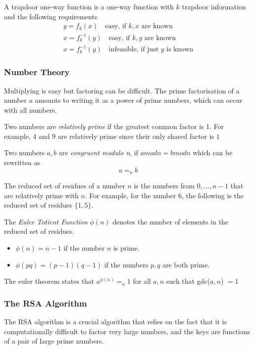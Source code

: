 \documentclass[11pt]{article}
\begin{document}
A trapdoor one-way function is a one-way function with $k$ trapdoor information and the following requirements
\begin{gather}
    y = f_k(x) \quad \text{easy, if $k,x$ are known} \\
    x = f_k^{-1}(y) \quad \text{easy, if $k,y$ are known} \\
    x = f_k^{-1}(y) \quad \text{infeasible, if just $y$ is known}
\end{gather}

\subsubsection{Number Theory}
Multiplying is easy but factoring can be difficult.
The prime factorisation of a number $a$ amounts to writing it as a power of prime numbers, which can occur with all numbers.

Two numbers are \textit{relatively prime} if the greatest common factor is 1.
For example, 4 and 9 are relatively prime since their only shared factor is $1$

Two numbers $a,b$ are \textit{congruent modulo n}, if $a mod n = b mod n$
which can be rewritten as 
\begin{equation}
    a =_n b
\end{equation}

The reduced set of residues of a number $n$ is the numbers from $0,\dots,n-1$ that are relatively prime with $n$.
For example, for the number 6, the following is the reduced set of residues $\{ 1,5 \}$.

The \textit{Euler Totient Function} $\phi (n)$ denotes the number of elements in the reduced set of residues.

\begin{itemize}
    \item $\phi(n) = n-1$ if the number $n$ is prime.
    \item $\phi(pq) = (p-1)(q-1)$ if the numbers $p,q$ are both prime.
\end{itemize}

The euler theorem states that $a^{\phi(n)} =_n 1$ for all $a,n$ such that gdc($a,n$) $= 1$

\subsubsection{The RSA Algorithm}
The RSA algorithm is a crucial algorithm that relies on the fact that it is computationally difficult to factor very large numbers, and the keys are functions of a pair of large prime numbers.
\end{document}
